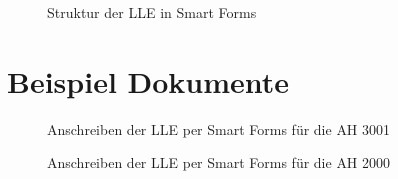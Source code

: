 \begin{figure}[ht]
	\centering
	\caption{Struktur der \acs{LLE} in Smart Forms}
	\label{AN:Smart3}
\end{figure}

\FloatBarrier

\section {Beispiel Dokumente}

\begin{figure}[ht] 
	\caption{Anschreiben der \acs{LLE} per Smart Forms für die \acs{AH} 3001}
		\label{AN:lleat}
\end{figure} 

\begin{figure}[ht] 
	\caption{Anschreiben der \acs{LLE} per Smart Forms für die \acs{AH} 2000}
	\label{AN:llebj}
\end{figure} 


